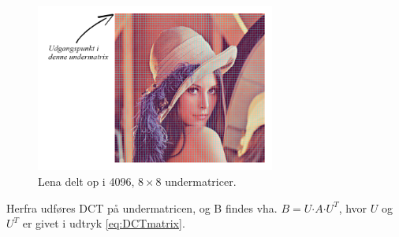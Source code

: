 \begin{figure}[htbp]
\centering
\includegraphics[width=0.7\textwidth]{billeder/lena-grid.png}
\caption{Lena delt op i 4096, $8 \times 8$ undermatricer.}
\label{fig:lena-grid-8x8}
\end{figure}

Herfra udføres DCT på undermatricen, og B findes vha. $B = U \boldsymbol{\cdot} A \boldsymbol{\cdot} U^T$, hvor $U$ og $U^T$ er givet i udtryk \vref{eq:DCTmatrix}.

